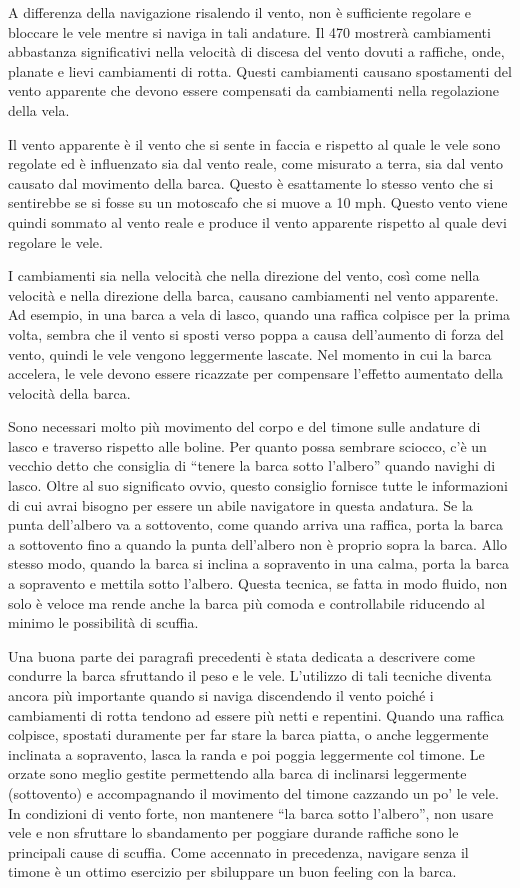 A differenza della navigazione risalendo il vento, non è sufficiente regolare e bloccare le
vele mentre si naviga in tali andature. Il 470 mostrerà cambiamenti abbastanza
significativi nella velocità di discesa del vento dovuti a raffiche, onde,
planate e lievi cambiamenti di rotta. Questi cambiamenti causano spostamenti del
vento apparente che devono essere compensati da cambiamenti nella regolazione
della vela.

Il vento apparente è il vento che si sente in faccia e rispetto al quale le vele sono
regolate ed è influenzato sia dal vento reale, come misurato a terra, sia dal
vento causato dal movimento della barca. Questo è esattamente lo stesso vento
che si sentirebbe se si fosse su un motoscafo che si muove a 10 mph. Questo
vento viene quindi sommato al vento reale e produce il vento apparente rispetto al quale
devi regolare le vele.

I cambiamenti sia nella velocità che nella direzione del vento, così come nella
velocità e nella direzione della barca, causano cambiamenti nel vento apparente.
Ad esempio, in una barca a vela di lasco, quando una raffica colpisce per la
prima volta, sembra che il vento si sposti verso poppa a causa dell'aumento di
forza del vento, quindi le vele vengono leggermente lascate. Nel momento in cui
la barca accelera, le vele devono essere ricazzate per compensare l'effetto
aumentato della velocità della barca.

Sono necessari molto più movimento del corpo e del timone sulle andature di
lasco e traverso rispetto alle boline. Per quanto possa sembrare sciocco, c'è un vecchio
detto che consiglia di ``tenere la barca sotto l'albero'' quando navighi di
lasco. Oltre al suo significato ovvio, questo consiglio fornisce tutte le
informazioni di cui avrai bisogno per essere un abile navigatore in questa andatura. Se la
punta dell'albero va a sottovento, come quando arriva una raffica, porta la
barca a sottovento fino a quando la punta dell'albero non è proprio sopra la
barca. Allo stesso modo, quando la barca si inclina a sopravento in una calma,
porta la barca a sopravento e mettila sotto l'albero. Questa tecnica, se fatta
in modo fluido, non solo è veloce ma rende anche la barca più comoda e
controllabile riducendo al minimo le possibilità di scuffia.

Una buona parte dei paragrafi precedenti è stata dedicata a descrivere come
condurre la barca sfruttando il peso e le vele. L'utilizzo di tali tecniche
diventa ancora più importante quando si naviga discendendo il vento poiché i cambiamenti di rotta
tendono ad essere più netti e repentini. Quando una
raffica colpisce, spostati duramente per far stare la barca piatta, o anche
leggermente inclinata a sopravento, lasca la randa e poi poggia leggermente col
timone. Le orzate sono meglio gestite permettendo alla
barca di inclinarsi leggermente (sottovento) e accompagnando il movimento del
timone cazzando un po' le vele. In condizioni di vento forte, non mantenere ``la barca
sotto l'albero'', non usare vele e non sfruttare lo sbandamento per poggiare durande raffiche
sono le principali cause di scuffia. Come accennato in precedenza,
navigare senza il timone è un ottimo esercizio per sbiluppare un buon feeling
con la barca.

